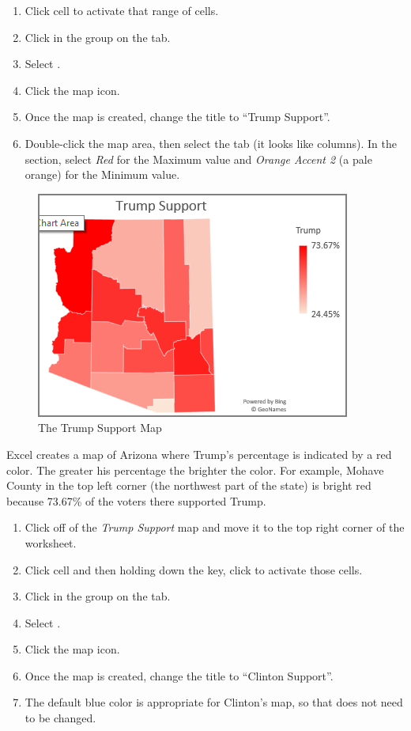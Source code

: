 \begin{enumerate}[resume]
	\item Click cell  to activate that range of cells.
	\item Click  in the  group on the  tab.
	\item Select .
	\item Click the map icon.
	\item Once the map is created, change the title to ``Trump Support''.
	\item Double-click the map area, then select the  tab (it looks like columns). In the  section, select \textit{Red} for the Maximum value and \textit{Orange Accent 2} (a pale orange) for the Minimum value. 
\end{enumerate}

\begin{figure}[H]
	\centering
	\includegraphics[width=\maxwidth{.95\linewidth}]{gfx/ch08_fig40}
	\caption{The Trump Support Map}
	\label{08:fig40}
\end{figure}

Excel creates a map of Arizona where Trump's percentage is indicated by a red color. The greater his percentage the brighter the color. For example, Mohave County in the top left corner (the northwest part of the state) is bright red because 73.67\% of the voters there supported Trump.

\begin{enumerate}[resume]
	\item Click off of the \textit{Trump Support} map and move it to the top right corner of the worksheet.
	\item Click cell  and then holding down the  key, click  to activate those cells.
	\item Click  in the  group on the  tab.
	\item Select .
	\item Click the map icon.
	\item Once the map is created, change the title to ``Clinton Support''.
	\item The default blue color is appropriate for Clinton's map, so that does not need to be changed.
\end{enumerate}

